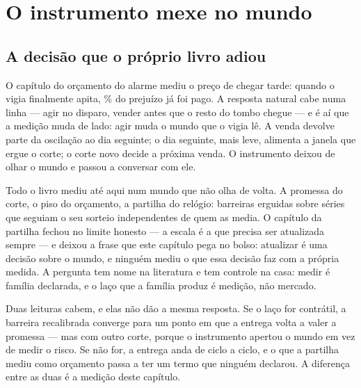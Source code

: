 
\chapter{O instrumento mexe no mundo}\label{cap:instrumento}

\section{A decisão que o próprio livro adiou}

O capítulo do orçamento do alarme mediu o preço de chegar tarde: quando o vigia finalmente apita,
\numVigiaTomboRecentePagoPct\% do prejuízo já foi pago. A resposta natural cabe numa linha --- agir
no disparo, vender antes que o resto do tombo chegue --- e é aí que a medição muda de lado: agir
muda o mundo que o vigia lê. A venda devolve parte da oscilação ao dia seguinte; o dia seguinte,
mais leve, alimenta a janela que ergue o corte; o corte novo decide a próxima venda. O instrumento
deixou de olhar o mundo e passou a conversar com ele.

Todo o livro mediu até aqui num mundo que não olha de volta. A promessa do corte, o piso do
orçamento, a partilha do relógio: barreiras erguidas sobre séries que seguiam o seu sorteio
independentes de quem as media. O capítulo da partilha fechou no limite honesto --- a escala é a
que precisa ser atualizada sempre --- e deixou a frase que este capítulo pega no bolso: atualizar
é uma decisão sobre o mundo, e ninguém mediu o que essa decisão faz com a própria medida. A
pergunta tem nome na literatura \cite{perdomo2020performative} e tem controle na casa: medir é
família declarada, e o laço que a família produz é medição, não mercado.

Duas leituras cabem, e elas não dão a mesma resposta. Se o laço for contrátil, a barreira
recalibrada converge para um ponto em que a entrega volta a valer a promessa --- mas com outro
corte, porque o instrumento apertou o mundo em vez de medir o risco. Se não for, a entrega anda de
ciclo a ciclo, e o que a partilha mediu como orçamento passa a ter um termo que ninguém declarou.
A diferença entre as duas é a medição deste capítulo.

